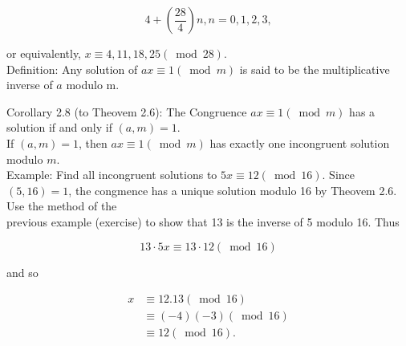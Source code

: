 \documentclass[10pt]{article}
\begin{document}
$$
4+\left(\frac{28}{4}\right) n, n=0,1,2,3,
$$

or equivalently, $x \equiv 4,11,18,25(\bmod 28)$.\\
Definition: Any solution of $a x \equiv 1(\bmod m)$ is said to be the multiplicative inverse of $a$ modulo m.

Corollary 2.8 (to Theovem 2.6): The Congruence $a x \equiv 1(\bmod m)$ has a solution if and only if $(a, m)=1$.\\
If $(a, m)=1$, then $a x \equiv 1(\bmod m)$ has exactly one incongruent solution modulo $m$.\\
Example: Find all incongruent solutions to $5 x \equiv 12(\bmod 16)$. Since $(5,16)=1$, the congmence has a unique solution modulo 16 by Theovem 2.6. Use the method of the\\
previous example (exercise) to show that 13 is the inverse of 5 modulo 16. Thus

$$
13 \cdot 5 x \equiv 13 \cdot 12(\bmod 16)
$$

and so

$$
\begin{aligned}
x & \equiv 12.13(\bmod 16) \\
& \equiv(-4)(-3)(\bmod 16) \\
& \equiv 12(\bmod 16) .
\end{aligned}
$$
\end{document}
